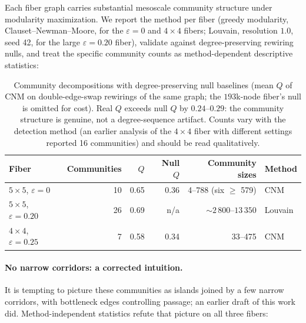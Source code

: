 \documentclass[11pt]{article}
\begin{document}
Each fiber graph carries substantial mesoscale community structure
under modularity maximization. We report the method per fiber (greedy
modularity, Clauset--Newman--Moore, for the $\varepsilon = 0$ and
$4 \times 4$ fibers; Louvain, resolution $1.0$, seed 42, for the large
$\varepsilon = 0.20$ fiber), validate against degree-preserving
rewiring nulls, and treat the specific community counts as
method-dependent descriptive statistics:

\begin{table}[H]
\centering
\small
\begin{tabular}{lrrrrl}
\toprule
Fiber & Communities & $Q$ & Null $Q$ & Community sizes & Method \\
\midrule
$5 \times 5$, $\varepsilon = 0$    & 10 & 0.65 & 0.36 & 4--788 (six $\ge$ 579) & CNM \\
$5 \times 5$, $\varepsilon = 0.20$ & 26 & 0.69 & n/a  & $\sim 2\,800$--$13\,350$ & Louvain \\
$4 \times 4$, $\varepsilon = 0.25$ & 7  & 0.58 & 0.34 & 33--475 & CNM \\
\bottomrule
\end{tabular}
\caption{Community decompositions with degree-preserving null
  baselines (mean $Q$ of CNM on double-edge-swap rewirings of the same
  graph; the $193$k-node fiber's null is omitted for cost). Real $Q$
  exceeds null $Q$ by $0.24$--$0.29$: the community structure is
  genuine, not a degree-sequence artifact. Counts vary with the
  detection method (an earlier analysis of the $4 \times 4$ fiber with
  different settings reported 16 communities) and should be read
  qualitatively.}
\label{tab:communities}
\end{table}

\paragraph{No narrow corridors: a corrected intuition.}\label{sec:fiber-corridors-invariant}

It is tempting to picture these communities as islands joined by a few
narrow corridors, with bottleneck edges controlling passage; an
earlier draft of this work did. Method-independent statistics refute
that picture on all three fibers:
\end{document}
